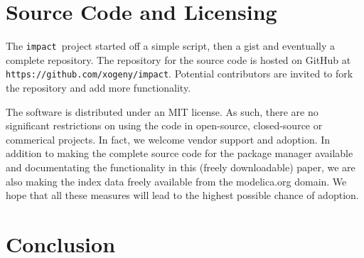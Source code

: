 \documentclass[11pt,a4paper,twocolumn]{article}
\newcommand{\impact}{\texttt{impact}} %
\newcommand{\code}[1]{\texttt{#1}} %
\begin{document}



\section{Source Code and Licensing}
\label{sec:source}

The \impact\ project started off a simple script, then a gist and eventually a 
complete repository.  The repository for the source code is hosted on GitHub at
\code{https://github.com/xogeny/impact}.  Potential contributors are invited to 
fork the repository and add more functionality.

The software is distributed under an MIT license.  As such, there are no 
significant restrictions on using the code in open-source, closed-source or 
commerical projects.
In fact, we welcome vendor support and adoption.  In addition to making the 
complete source code for the package manager available and documentating the 
functionality in this (freely downloadable) paper, we are also making the index 
data freely available from the modelica.org domain.   We hope that all these 
measures will lead to the highest possible chance of adoption.

\section{Conclusion}
\label{sec:conclusion}







\end{document}
